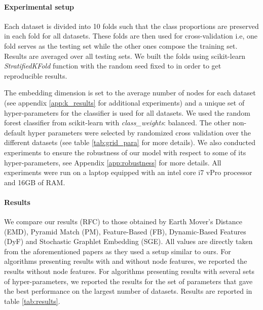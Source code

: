 \documentclass{article}
\begin{document}
\paragraph{Experimental setup}
\label{para:experimental_setup}
Each dataset is divided into 10 folds such that the class proportions are preserved in each fold for all datasets. These folds are then used for cross-validation i.e, one fold serves as the testing set while the other ones compose the training set. Results are averaged over all testing sets. We built the folds using scikit-learn \cite{pedregosa2011scikit} \textit{StratifiedKFold} function with the random seed fixed to  in order to get reproducible results.


The embedding dimension is set to the average number of nodes for each dataset (see appendix \ref{app:k_results} for additional experiments) and a unique set of hyper-parameters for the classifier is used for all datasets. We used the random forest classifier from scikit-learn with \textit{class\_weights}: balanced. The other non-default hyper parameters were selected by randomized cross validation over the different datasets (see table \ref{tab:grid_para} for more details). We also conducted experiments to ensure the robustness of our model with respect to some of its hyper-parameters, see Appendix \ref{app:robustness} for more details. All experiments were run on a laptop equipped with an intel core i7 vPro processor and 16GB of RAM.

\paragraph{Results}
We compare our results (RFC) to those obtained by Earth Mover's Distance \citep{nikolentzos2017matching} (EMD), Pyramid Match \citep{nikolentzos2017matching} (PM), Feature-Based \citep{barnett2016feature} (FB), Dynamic-Based Features \citep{gomez2017dynamics} (DyF) and Stochastic Graphlet Embedding \citep{dutta2017high} (SGE). All values are directly taken from the aforementioned papers as they used a setup similar to ours. For algorithms presenting results with and without node features, we reported the results without node features. For algorithms presenting results with several sets of hyper-parameters, we reported the results for the set of parameters that gave the best performance on the largest number of datasets. Results are reported in table \ref{tab:results}.
\end{document}

